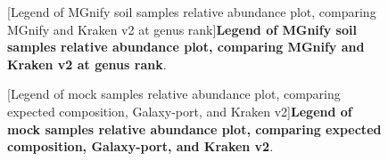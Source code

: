 \begin{figure}[H]
  \centering
  [Legend of MGnify soil samples relative abundance plot, comparing MGnify and Kraken v2 at genus rank]{\textbf{Legend of MGnify soil samples relative abundance plot, comparing MGnify and Kraken v2 at genus rank}.} \label{fig:soil_abundance_level_g_mgnifyVSkraken2_legend.png}%
\end{figure}

\begin{figure}[H]
  \centering
  [Legend of mock samples relative abundance plot, comparing expected composition, Galaxy-port, and Kraken v2]{\textbf{Legend of mock samples relative abundance plot, comparing expected composition, Galaxy-port, and Kraken v2}.} \label{fig:mock_rel_abundance_level_g_legend}%
\end{figure}

